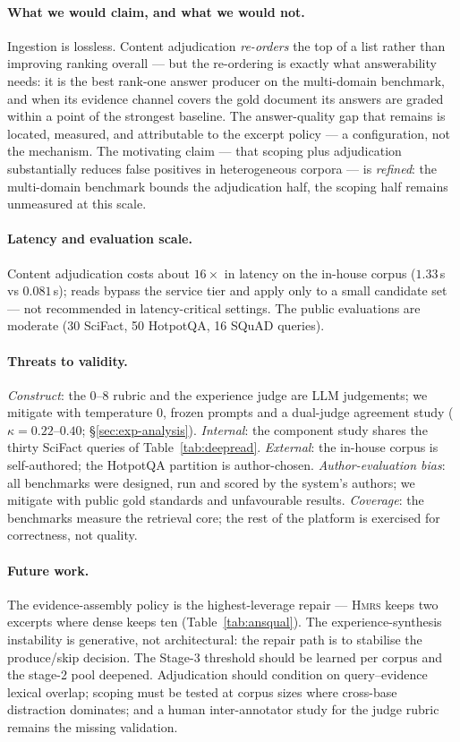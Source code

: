 \documentclass[sigconf, review, anonymous]{acmart}
\newcommand{\sys}{\textsc{Hmrs}}
\begin{document}
\paragraph{What we would claim, and what we would not.}
Ingestion is lossless. Content adjudication
\emph{re-orders} the top of a list rather than improving ranking overall ---
but the re-ordering is exactly what answerability needs: it is the best
rank-one answer producer on the multi-domain benchmark, and when its evidence
channel covers the gold document its answers are graded within a point of the
strongest baseline. The answer-quality gap that remains is located, measured,
and attributable to the excerpt policy --- a configuration, not the mechanism.
The motivating claim --- that scoping plus adjudication substantially reduces
false positives in heterogeneous corpora --- is \emph{refined}: the
multi-domain benchmark bounds the adjudication half, the scoping half remains
unmeasured at this scale.

\paragraph{Latency and evaluation scale.}
Content adjudication costs about $16\times$ in latency on the in-house corpus
($1.33$\,s vs $0.081$\,s); reads bypass the service tier and apply only to a
small candidate set --- not recommended in latency-critical settings. The
public evaluations are moderate (30 SciFact, 50 HotpotQA, 16 SQuAD queries).

\paragraph{Threats to validity.}
\emph{Construct}: the $0$--$8$ rubric and the experience judge are LLM
judgements; we mitigate with temperature $0$, frozen prompts and a dual-judge
agreement study ($\kappa{=}0.22$--$0.40$; \S\ref{sec:exp-analysis}).
\emph{Internal}: the component study shares the thirty SciFact queries of
Table~\ref{tab:deepread}. \emph{External}: the in-house corpus is self-authored;
the HotpotQA partition is author-chosen. \emph{Author-evaluation bias}: all
benchmarks were designed, run and scored by the system's authors; we mitigate
with public gold standards and unfavourable results. \emph{Coverage}: the
benchmarks measure the retrieval core; the rest of the platform is exercised
for correctness, not quality.

\paragraph{Future work.}
The evidence-assembly policy is the highest-leverage repair --- \sys{} keeps
two excerpts where dense keeps ten (Table~\ref{tab:ansqual}). The
experience-synthesis instability is generative, not architectural: the repair
path is to stabilise the produce/skip decision. The Stage-3 threshold should
be learned per corpus and the stage-2 pool deepened. Adjudication should
condition on query--evidence lexical overlap; scoping must be tested at corpus
sizes where cross-base distraction dominates; and a human inter-annotator
study for the judge rubric remains the missing validation.
\end{document}
